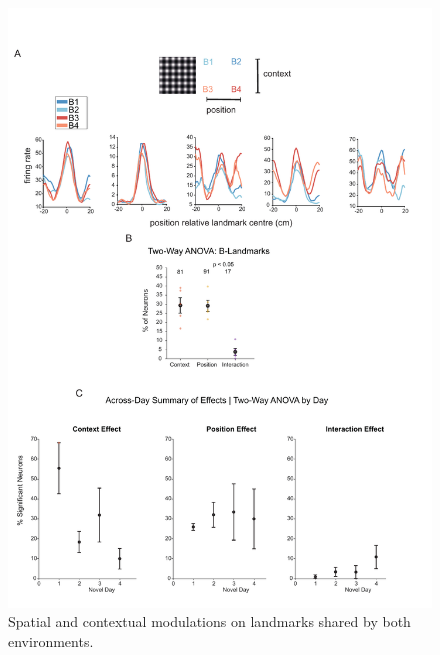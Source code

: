 \begin{figure}
    \centering
    \includegraphics[width=1\linewidth]{figures//Chapter 4 V1/fig4_spatial_modulation_tests.pdf}
    \caption{Spatial and contextual modulations on landmarks shared by both environments. }
    \label{fig:placeholder}
\end{figure}